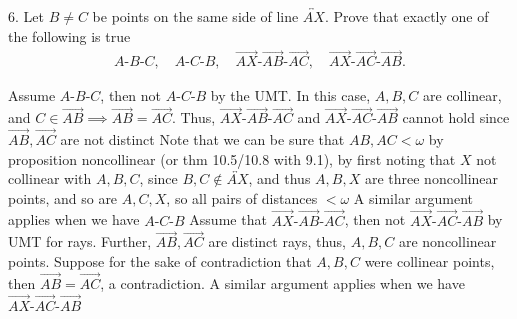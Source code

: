 \documentclass{report}
\begin{document}
    \pagebreak \bigbreak \noindent 
    \begin{mdframed}
        6. Let $B \ne C$ be points on the same side of line $\overleftrightarrow{AX}$. Prove that exactly one of the following is true
        \begin{align*}
            A\text{-}B\text{-}C, \quad A\text{-}C\text{-}B, \quad \overrightarrow{AX}\text{-}\overrightarrow{AB}\text{-}\overrightarrow{AC}, \quad \overrightarrow{AX}\text{-}\overrightarrow{AC}\text{-}\overrightarrow{AB}
        .\end{align*}
    \end{mdframed}
    \bigbreak \noindent 
    Assume $ A\text{-}B\text{-}C$, then not $ A\text{-}C\text{-}B$ by the UMT. In this case, $A,B,C$ are collinear, and $C \in \overrightarrow{AB} \implies \overrightarrow{AB} = \overrightarrow{AC}$. Thus, $ \overrightarrow{AX}\text{-}\overrightarrow{AB}\text{-}\overrightarrow{AC} $ and $ \overrightarrow{AX}\text{-}\overrightarrow{AC}\text{-}\overrightarrow{AB} $ cannot hold since $\overrightarrow{AB}, \overrightarrow{AC}$ are not distinct
    \bigbreak \noindent 
    Note that we can be sure that $AB,AC < \omega$ by proposition noncollinear (or thm 10.5/10.8 with 9.1), by first noting that $X$ not collinear with $A,B,C$, since $B,C \not\in \overleftrightarrow{AX} $, and thus $A,B,X$ are three noncollinear points, and so are $A,C,X $, so all pairs of distances $< \omega$
    \bigbreak \noindent 
    A similar argument applies when we have $ A\text{-}C\text{-}B $
    \bigbreak \noindent 
    Assume that $ \overrightarrow{AX}\text{-}\overrightarrow{AB}\text{-}\overrightarrow{AC}$, then not $ \overrightarrow{AX}\text{-}\overrightarrow{AC}\text{-}\overrightarrow{AB} $ by UMT for rays. Further, $ \overrightarrow{AB}, \overrightarrow{AC}$ are distinct rays, thus, $A,B,C$ are noncollinear points.
    \bigbreak \noindent 
    Suppose for the sake of contradiction that $A,B,C$ were collinear points, then $\overrightarrow{AB} = \overrightarrow{AC}$, a contradiction.
    \bigbreak \noindent 
    A similar argument applies when we have $ \overrightarrow{AX}\text{-}\overrightarrow{AC}\text{-}\overrightarrow{AB} $







    
\end{document}
